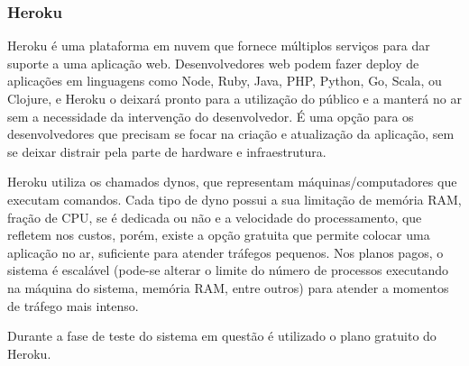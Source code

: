 \subsubsection{Heroku}

Heroku é uma plataforma em nuvem que fornece múltiplos serviços para dar suporte a uma aplicação web. Desenvolvedores web podem fazer deploy de aplicações em linguagens como Node, Ruby, Java, PHP, Python, Go, Scala, ou Clojure, e Heroku o deixará pronto para a utilização do público e a manterá no ar sem a necessidade da intervenção do desenvolvedor. É uma opção para os desenvolvedores que precisam se focar na criação e atualização da aplicação, sem se deixar distrair pela parte de hardware e infraestrutura.  

Heroku utiliza os chamados dynos, que representam máquinas/computadores que executam comandos. Cada tipo de dyno possui a sua limitação de memória RAM, fração de CPU, se é dedicada ou não e a velocidade do processamento, que refletem nos custos, porém, existe a opção gratuita que permite colocar uma aplicação no ar, suficiente para atender tráfegos pequenos. Nos planos pagos, o sistema é escalável (pode-se alterar o limite do número de processos executando na máquina do sistema, memória RAM, entre outros) para atender a momentos de tráfego mais intenso.\cite{heroku}

Durante a fase de teste do sistema em questão é utilizado o plano gratuito do Heroku.